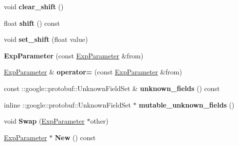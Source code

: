 \begin{DoxyCompactItemize}
void {\bfseries clear\+\_\+shift} ()
\item 
\mbox{\label{classcaffe_1_1_exp_parameter_a43b60fada9ee5506b78270cbf459f5ac}} 
float {\bfseries shift} () const
\item 
\mbox{\label{classcaffe_1_1_exp_parameter_a21fbcb6ca095b0e4af2f36449ce2ad60}} 
void {\bfseries set\+\_\+shift} (float value)
\item 
\mbox{\label{classcaffe_1_1_exp_parameter_a06bb7c6918ddf9855475155ea486a3a1}} 
{\bfseries Exp\+Parameter} (const \mbox{\hyperlink{classcaffe_1_1_exp_parameter}{Exp\+Parameter}} \&from)
\item 
\mbox{\label{classcaffe_1_1_exp_parameter_a8020a22dbac661ffc67dc8a6a07927e7}} 
\mbox{\hyperlink{classcaffe_1_1_exp_parameter}{Exp\+Parameter}} \& {\bfseries operator=} (const \mbox{\hyperlink{classcaffe_1_1_exp_parameter}{Exp\+Parameter}} \&from)
\item 
\mbox{\label{classcaffe_1_1_exp_parameter_ad483b059bf3df573a7308fe042aed578}} 
const \+::google\+::protobuf\+::\+Unknown\+Field\+Set \& {\bfseries unknown\+\_\+fields} () const
\item 
\mbox{\label{classcaffe_1_1_exp_parameter_a8a35de82bc1acaff28500ae141f78513}} 
inline \+::google\+::protobuf\+::\+Unknown\+Field\+Set $\ast$ {\bfseries mutable\+\_\+unknown\+\_\+fields} ()
\item 
\mbox{\label{classcaffe_1_1_exp_parameter_a3b823c40695afd4c43ccc427a9eb72ce}} 
void {\bfseries Swap} (\mbox{\hyperlink{classcaffe_1_1_exp_parameter}{Exp\+Parameter}} $\ast$other)
\item 
\mbox{\label{classcaffe_1_1_exp_parameter_a56886731038059e8ec11aa27d590ff0e}} 
\mbox{\hyperlink{classcaffe_1_1_exp_parameter}{Exp\+Parameter}} $\ast$ {\bfseries New} () const
\item 
\mbox{\label{classcaffe_1_1_exp_parameter_afdcdce8a3fc5cf5543464bed0e55a01e}} 

\end{DoxyCompactItemize}
